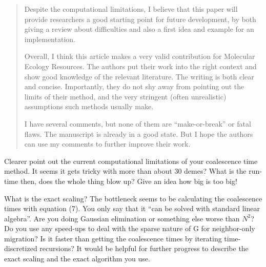 \begin{quote}
    Despite the computational limitations, I believe that this paper will provide
    researchers a good starting point for future development, by both giving a
    review about difficulties and also a first idea and example for an
    implementation.

    Overall, I think this article makes a very valid contribution for Molecular
    Ecology Resources. The authors put their work into the right context and
    show good knowledge of the relevant literature. The writing is both clear
    and concise. Importantly, they do not shy away from pointing out the limits
    of their method, and the very stringent (often unrealistic) assumptions
    such methods usually make.

    I have several comments, but none of them are ``make-or-break'' or fatal flaws.
    The manuscript is already in a good state. But I hope the authors can use my
    comments to further improve their work.  
\end{quote}


\begin{point}{}
    Clearer point out the current computational limitations of your coalescence
time method. It seems it gets tricky with more than about 30 demes? What is the
run-time then, does the whole thing blow up? Give an idea how big is too big!
\end{point}


\begin{point}{}
    What is the exact scaling? The bottleneck seems to be calculating the
    coalescence times with equation (7). You only say that it ``can be solved
    with standard linear algebra''. Are you doing Gaussian elimination or
    something else worse than $N^2$? Do you use any speed-ups to
    deal with the sparse nature of G for neighbor-only migration? Is it faster
    than getting the coalescence times by iterating time-discretized
    recursions?  It would be helpful for further progress to describe the exact
    scaling and the exact algorithm you use.
\end{point}


